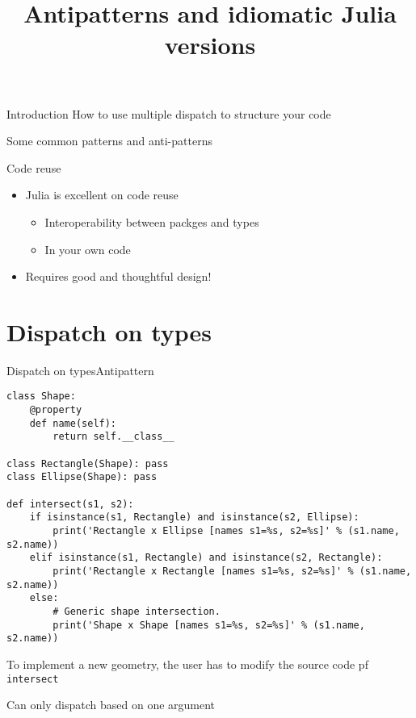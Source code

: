 

\title{Antipatterns and idiomatic Julia versions}

\maketitle

\begin{frame}{Introduction}{}
    How to use multiple dispatch to structure your code

    Some common patterns and anti-patterns
    \pause
    \begin{block}{Code reuse}
        \begin{itemize}
            \item Julia is excellent on code reuse
            \begin{itemize}
                \item Interoperability between packges and types
                \item In your own code
            \end{itemize}
            \item Requires good and thoughtful design!
        \end{itemize}
    \end{block}

\end{frame}



\section{Dispatch on types}

\begin{frame}[fragile]{Dispatch on types}{Antipattern}

    \begin{verbatim}
class Shape:
    @property
    def name(self):
        return self.__class__

class Rectangle(Shape): pass
class Ellipse(Shape): pass

def intersect(s1, s2):
    if isinstance(s1, Rectangle) and isinstance(s2, Ellipse):
        print('Rectangle x Ellipse [names s1=%s, s2=%s]' % (s1.name, s2.name))
    elif isinstance(s1, Rectangle) and isinstance(s2, Rectangle):
        print('Rectangle x Rectangle [names s1=%s, s2=%s]' % (s1.name, s2.name))
    else:
        # Generic shape intersection.
        print('Shape x Shape [names s1=%s, s2=%s]' % (s1.name, s2.name))
    \end{verbatim}
     To implement a new geometry, the user has to
modify the source code pf \texttt{intersect}

\vspace{3mm}
Can only dispatch based on one argument
\end{frame}


